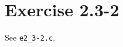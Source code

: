 \documentclass{article}
\begin{document}
\section*{Exercise 2.3-2}

See \texttt{e2\_3-2.c}.
\end{document}
